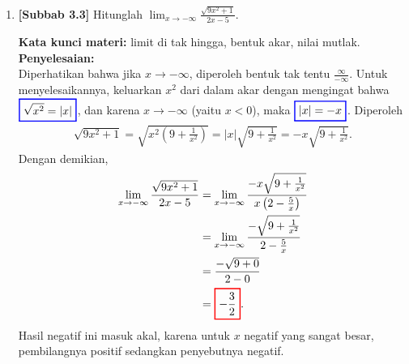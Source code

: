 \documentclass[10pt,openany,a4paper]{article}
\theoremstyle{definition}
\theoremstyle{definition}
\theoremstyle{plain}
\newenvironment{jawab}[2][tes]{%
\par\noindent\textbf{Kata kunci materi:} #1.\\
\textbf{Penyelesaian:} #2%
}{}
\begin{document}
\begin{enumerate}
    \item \textbf{[Subbab 3.3]} Hitunglah $\displaystyle\lim_{x\to-\infty}\frac{\sqrt{9x^2+1}}{2x-5}$.
    \begin{jawab}[limit di tak hingga, bentuk akar, nilai mutlak]{~\\
        Diperhatikan bahwa jika $x\to-\infty$, diperoleh bentuk tak tentu $\frac{\infty}{-\infty}$. Untuk menyelesaikannya, keluarkan $x^2$ dari dalam akar dengan mengingat bahwa $\colorlet{oldcolor}{.}
        \color{blue}
        \setlength{\fboxrule}{1pt} \boxed{\color{oldcolor}\sqrt{x^2}=|x|}\color{oldcolor}$, dan karena $x\to-\infty$ (yaitu $x<0$), maka $\colorlet{oldcolor}{.}
        \color{blue}
        \setlength{\fboxrule}{1pt} \boxed{\color{oldcolor}|x|=-x}\color{oldcolor}$. Diperoleh
        \begin{align*}
            \sqrt{9x^2+1} = \sqrt{x^2\left(9+\frac{1}{x^2}\right)} = |x|\sqrt{9+\frac{1}{x^2}} = -x\sqrt{9+\frac{1}{x^2}}.
        \end{align*}
        Dengan demikian,
        \begin{align*}
            \lim_{x\to-\infty}\frac{\sqrt{9x^2+1}}{2x-5} &= \lim_{x\to-\infty}\frac{-x\sqrt{9+\frac{1}{x^2}}}{x\left(2-\frac{5}{x}\right)}\\
            &= \lim_{x\to-\infty}\frac{-\sqrt{9+\frac{1}{x^2}}}{2-\frac{5}{x}}\\
            &= \frac{-\sqrt{9+0}}{2-0}\\
            &= \colorlet{oldcolor}{.}
        \color{red}
        \setlength{\fboxrule}{1pt} \boxed{\color{oldcolor}-\frac{3}{2}}\color{oldcolor}.
        \end{align*}
        Hasil negatif ini masuk akal, karena untuk $x$ negatif yang sangat besar, pembilangnya positif sedangkan penyebutnya negatif.
    }
    \end{jawab}


\end{enumerate}
\end{document}
